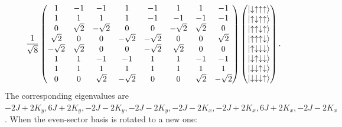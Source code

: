 \documentclass[aps,amsmath,twocolumn,amssymb,floatfix,showpacs,superscriptaddress,nofootinbib,longbibliography]{revtex4-1}
\begin{document}
{\small
\begin{eqnarray}
	\frac{1}{\sqrt{8}}
\begin{pmatrix}
	1 & -1 & -1 & 1 & -1 & 1 & 1 & -1 \\
	1 & 1 & 1 & 1 & -1 & -1 & -1 & -1 \\
	0 & \sqrt{2} & -\sqrt{2} & 0 & 0 & -\sqrt{2} & \sqrt{2} & 0 \\
	\sqrt{2} & 0 & 0 & -\sqrt{2} & -\sqrt{2} & 0 & 0 & \sqrt{2} \\
	-\sqrt{2} & \sqrt{2} & 0 & 0 & -\sqrt{2} & \sqrt{2} & 0 & 0 \\
	1 & 1 & -1 & -1 & 1 & 1 & -1 & -1 \\
	1 & 1 & 1 & 1 & 1 & 1 & 1 & 1 \\
	0 & 0 & \sqrt{2} & -\sqrt{2} & 0 & 0 & \sqrt{2} & -\sqrt{2} \\
\end{pmatrix}
\begin{pmatrix}
	\ket{\downarrow\uparrow\uparrow\uparrow}\\
	\ket{\uparrow\downarrow\uparrow\uparrow}\\
	\ket{\uparrow\uparrow\downarrow\uparrow}\\
	\ket{\uparrow\uparrow\uparrow\downarrow}\\
	\ket{\uparrow\downarrow\downarrow\downarrow}\\
	\ket{\downarrow\uparrow\downarrow\downarrow}\\
	\ket{\downarrow\downarrow\uparrow\downarrow}\\
	\ket{\downarrow\downarrow\downarrow\uparrow}	
\end{pmatrix}.
\end{eqnarray}
}
The corresponding eigenvalues are $-2J+2K_y,6J+2K_y,-2J-2K_y,-2J-2K_y,-2J-2K_x,-2J+2K_x,6J+2K_x,-2J-2K_x$. When the even-sector basis is rotated to a new one:
\end{document}
